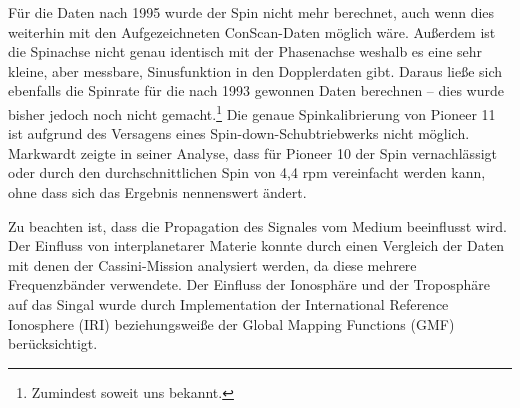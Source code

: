 Für die Daten nach 1995 wurde der Spin nicht mehr berechnet, auch wenn dies weiterhin mit den Aufgezeichneten ConScan-Daten möglich wäre. Außerdem ist die Spinachse nicht genau identisch mit der Phasenachse weshalb es eine sehr kleine, aber messbare, Sinusfunktion in den Dopplerdaten gibt. Daraus ließe sich ebenfalls die Spinrate für die nach 1993 gewonnen Daten berechnen – dies wurde bisher jedoch noch nicht gemacht.\footnote{Zumindest soweit uns bekannt.}
Die genaue Spinkalibrierung von Pioneer 11 ist aufgrund des Versagens eines Spin-down-Schubtriebwerks nicht möglich\cite{Anderson2002}.
Markwardt zeigte in seiner Analyse, dass für Pioneer 10 der Spin vernachlässigt oder durch den durchschnittlichen Spin von 4,4 rpm vereinfacht werden kann, ohne dass sich das Ergebnis nennenswert ändert\cite{Markwardt2002}.

Zu beachten ist, dass die Propagation des Signales vom Medium beeinflusst wird. Der Einfluss von interplanetarer Materie konnte durch einen Vergleich
der Daten mit denen der Cassini-Mission analysiert werden, da diese mehrere Frequenzbänder verwendete\cite{Dittus2006}. %
Der Einfluss der Ionosphäre und der Troposphäre auf das Singal wurde durch Implementation der International Reference Ionosphere (IRI)
beziehungsweiße der Global Mapping Functions (GMF) berücksichtigt\cite{Levy2008}. %


